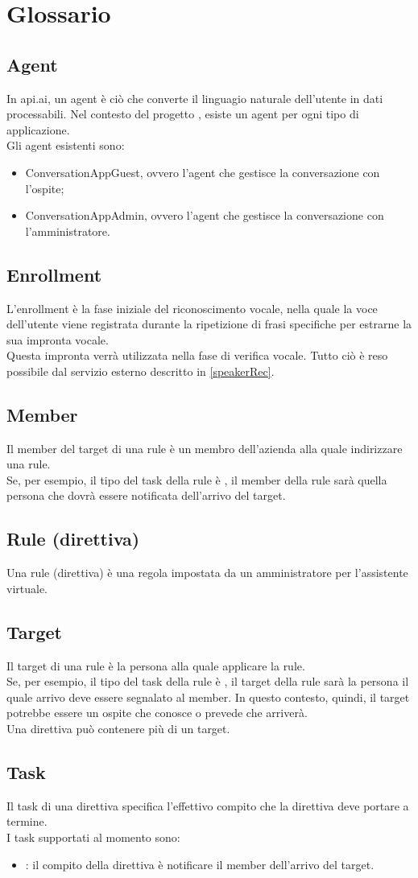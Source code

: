 \section{Glossario}
\subsection*{Agent}
In api.ai, un agent è ciò che converte il linguagio naturale dell'utente in dati processabili. Nel contesto del progetto \PROGETTO, esiste un agent per ogni tipo di applicazione.\\
Gli agent esistenti sono:
\begin{itemize}
	\item ConversationAppGuest, ovvero l'agent che gestisce la conversazione con l'ospite;
	\item ConversationAppAdmin, ovvero l'agent che gestisce la conversazione con l'amministratore.
\end{itemize}
\subsection*{Enrollment}
L'enrollment è la fase iniziale del riconoscimento vocale, nella quale la voce dell’utente viene registrata durante la ripetizione di frasi specifiche per estrarne la sua impronta vocale.\\
Questa impronta verrà utilizzata nella fase di verifica vocale. Tutto ciò è reso possibile dal servizio esterno descritto in \ref{speakerRec}.
\subsection*{Member}
Il member del target di una rule è un membro dell'azienda alla quale indirizzare una rule. \\
Se, per esempio, il tipo del task della rule è , il member della rule sarà quella persona che dovrà essere notificata dell'arrivo del target.
\subsection*{Rule (direttiva)}
Una rule (direttiva) è una regola impostata da un amministratore per l'assistente virtuale.
\subsection*{Target}
Il target di una rule è la persona alla quale applicare la rule. \\
Se, per esempio, il tipo del task della rule è , il target della rule sarà la persona il quale arrivo deve essere segnalato al member. In questo contesto, quindi, il target potrebbe essere un ospite che \PROPONENTE{} conosce o prevede che arriverà.\\
Una direttiva può contenere più di un target.
\subsection*{Task}\label{task}
Il task di una direttiva specifica l'effettivo compito che la direttiva deve portare a termine.\\
I task supportati al momento sono:
\begin{itemize}
	\item {}: il compito della direttiva è notificare il member dell'arrivo del target.
\end{itemize}